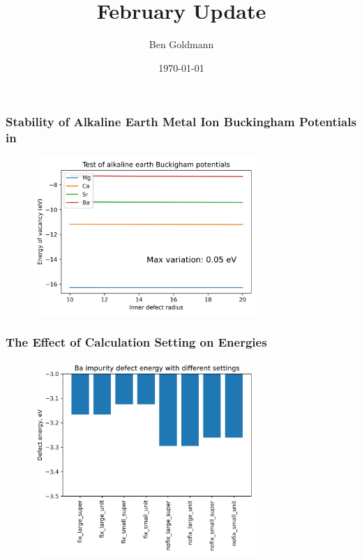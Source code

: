\documentclass{beamer}
\title{February Update}
\author{Ben Goldmann}
\date{\today}
\begin{document}
\begin{frame}
\titlepage
\end{frame}

\begin{frame}
\frametitle{Stability of Alkaline Earth Metal Ion Buckingham Potentials in }

\begin{figure}
\includegraphics[width=0.75\textwidth]{buckingham_test.jpg}
\end{figure}

\end{frame}

\begin{frame}
\frametitle{The Effect of Calculation Setting on Energies}

\begin{figure}
\includegraphics[width=0.75\textwidth]{energy_settings.jpg}
\end{figure}

\end{frame}
\end{document}
